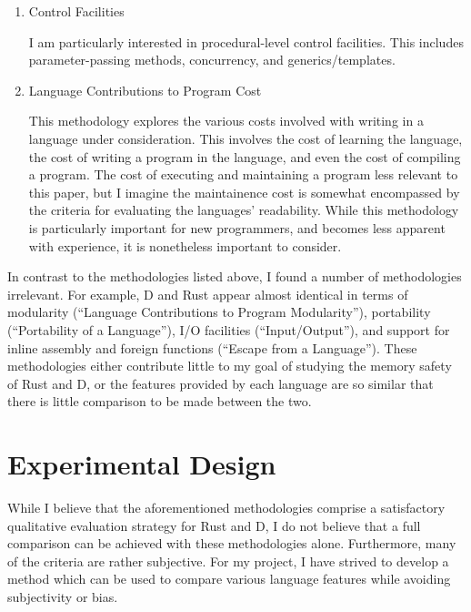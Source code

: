 \documentclass[finalcopy]{srpaper}
\begin{document}
\begin{enumerate}
\item Control Facilities

I am particularly interested in procedural-level control facilities. This
includes parameter-passing methods, concurrency, and generics/templates.

\item Language Contributions to Program Cost

This methodology explores the various costs involved with writing in a language
under consideration. This involves the cost of learning the language, the cost
of writing a program in the language, and even the cost of compiling a program.
The cost of executing and maintaining a program less relevant to this paper,
but I imagine the maintainence cost is somewhat encompassed by the criteria for
evaluating the languages' readability. While this methodology is particularly
important for new programmers, and becomes less apparent with experience, it is
nonetheless important to consider.

\end{enumerate}

In contrast to the methodologies listed above, I found a number of
methodologies irrelevant. For example, D and Rust appear almost identical in
terms of modularity (``Language Contributions to Program Modularity''),
portability (``Portability of a Language''), I/O facilities (``Input/Output''),
and support for inline assembly and foreign functions (``Escape from a
Language''). These methodologies either contribute little to my goal of
studying the memory safety of Rust and D, or the features provided by each
language are so similar that there is little comparison to be made between the
two.

\section{Experimental Design}

While I believe that the aforementioned methodologies comprise a satisfactory
qualitative evaluation strategy for Rust and D, I do not believe that a full
comparison can be achieved with these methodologies alone. Furthermore, many of
the criteria are rather subjective. For my project, I have strived to develop a
method which can be used to compare various language features while avoiding
subjectivity or bias.
\end{document}
